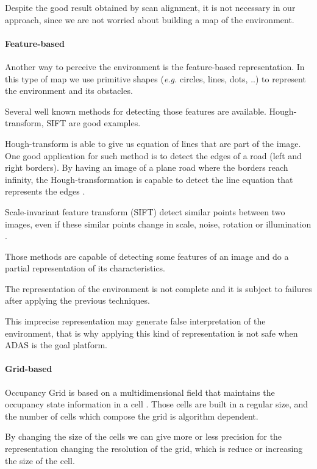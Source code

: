 Despite the good result obtained by scan alignment, it is not necessary in our approach, since we are not worried about building a map of the environment. 

\paragraph{Feature-based}

Another way to perceive the environment is the feature-based representation. In this type of map we use primitive shapes (\textit{e.g.} circles, lines, dots, ..) to represent the environment and its obstacles.

Several well known methods for detecting those features are available. Hough-transform, SIFT are good examples. 

Hough-transform is able to give us equation of lines that are part of the image. One good application for such method is to detect the edges of a road (left and right borders). By having an image of a plane road where the borders reach infinity, the Hough-transformation is capable to detect the line equation that represents the edges \cite{Ballard:1987:GHT:33517.33574}.

Scale-invariant feature transform (SIFT) detect similar points between two images, even if these similar points change in scale, noise, rotation or illumination \cite{Lowe:1999:ORL:850924.851523}.

Those methods are capable of detecting some features of an image and do a partial representation of its characteristics. 

The representation of the environment is not complete and it is subject to failures after applying the previous techniques.

This imprecise representation may generate false interpretation of the environment, that is why applying this kind of representation is not safe when ADAS is the goal platform.

\paragraph{Grid-based}
\label{ch02:gridbased}

Occupancy Grid is based on a multidimensional field that maintains the occupancy state information in a cell \cite{Elfes:1989:UOG:68491.68495}. Those cells are built in a regular size, and the number of cells which compose the grid is algorithm dependent.

By changing the size of the cells we can give more or less precision for the representation changing the resolution of the grid, which is reduce or increasing the size of the cell.

